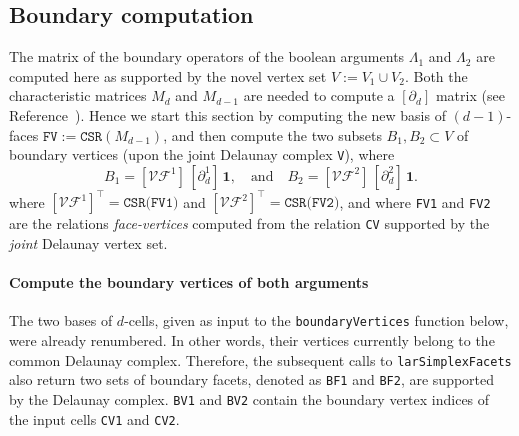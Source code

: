\documentclass[11pt,oneside]{article}	%
\begin{document}
\subsection{Boundary computation}
The matrix of the boundary operators of the boolean arguments $\Lambda_1$ and $\Lambda_2$ are computed here as supported by the novel vertex set $V := V_1 \cup V_2$. Both the characteristic matrices $M_d$ and $M_{d-1}$ are needed to compute a $[\partial_d]$ matrix (see Reference~\cite{Dicarlo:2014:TNL:2543138.2543294}). Hence we start this section by computing the new basis of $(d-1)$-faces $\texttt{FV} := \texttt{CSR}(M_{d-1})$, and then compute the two subsets $B_1,B_2 \subset V$ of boundary vertices (upon the joint Delaunay complex \texttt{V}), where
\[
B_1 = [\mathcal{VF}^1]\, [\partial_d^1]\,\mathbf{1},
\quad\mbox{and}\quad
B_2 = [\mathcal{VF}^2]\, [\partial_d^2]\,\mathbf{1}.
\]
where $[\mathcal{VF}^1]^\top = \texttt{CSR(FV1)}$ and $[\mathcal{VF}^2]^\top = \texttt{CSR(FV2)}$,
and where \texttt{FV1} and \texttt{FV2} are the relations \emph{face-vertices} computed from the relation \texttt{CV} supported by the \emph{joint} Delaunay vertex set. 

\paragraph{Compute the boundary vertices of both arguments}
The two bases of $d$-cells, given as input to the \texttt{boundaryVertices} function below, were already renumbered. In other words, their vertices currently belong to the common Delaunay complex. Therefore, the subsequent calls to \texttt{larSimplexFacets} also return two sets of boundary facets, denoted as \texttt{BF1} and \texttt{BF2}, are supported by the Delaunay complex. \texttt{BV1} and \texttt{BV2} contain the boundary vertex indices of the input cells \texttt{CV1} and \texttt{CV2}.
\end{document}
